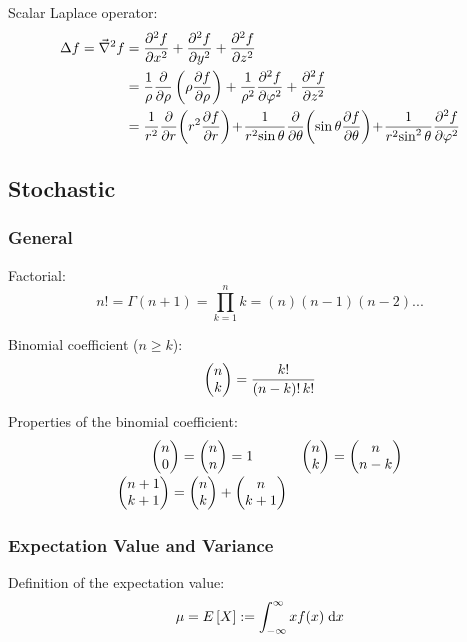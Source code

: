 			\noindent
			Scalar Laplace operator:
			\begin{equation}
				\begin{aligned}
					\Delta f = \Nabla^2 f &= \frac{\partial^2 f}{\partial x^2} + \frac{\partial^2 f}{\partial y^2} + \frac{\partial^2 f}{\partial z^2} \\
					&= \frac{1}{\rho} \frac{\partial}{\partial \rho}\left(\rho \frac{\partial f}{\partial \rho}\right)+ \frac{1}{\rho^2} \frac{\partial^2 f}{\partial \varphi^2}+ \frac{\partial^2 f}{\partial z^2} \\
					&= {\displaystyle \frac{1}{r^{2}} \frac{\partial }{\partial r}\!\left(r^{2}\frac{\partial f}{\partial r}\right)\!+\!\frac{1}{r^{2}\!\sin \theta } \frac{\partial }{\partial \theta }\!\left(\sin \theta \frac{\partial f}{\partial \theta }\right)\!+\!\frac{1}{r^{2}\!\sin ^{2}\theta }\frac{\partial ^{2}f}{\partial \varphi ^{2}}}
				\end{aligned}
			\end{equation}


	\subsection{Stochastic}
		\subsubsection{General}
			\noindent
			Factorial:
			\begin{equation}
				n!=\Gamma(n+1)=\prod_{k=1}^{n}k=(n)(n-1)(n-2)...
			\end{equation}

			\noindent
			Binomial coefficient ($n\ge k$):
			\begin{equation}
				\left(\begin{matrix}n\\k\end{matrix}\right) = \frac{k!}{\left(n-k\right)!\,k!}
			\end{equation}

			\noindent
			Properties of the binomial coefficient:
			\begin{equation}
				\begin{array}{cl}
					\left(\begin{matrix}n\\0\end{matrix}\right)=\left(\begin{matrix}n\\n\end{matrix}\right) = 1 & \left(\begin{matrix}n\\k\end{matrix}\right) = \left(\begin{matrix}n\\n-k\end{matrix}\right)\\ [8pt]
					\left(\begin{matrix}n+1\\k+1\end{matrix}\right)=\left(\begin{matrix}n\\k\end{matrix}\right)+\left(\begin{matrix}n\\k+1\end{matrix}\right)\\
				\end{array}
			\end{equation}

		\subsubsection{Expectation Value and Variance}
			\noindent
			Definition of the expectation value:
			\begin{equation}
				\mu = E\left[ X \right] := \int_{-\infty}^{\infty} xf(x)\;\mathrm{d} x
			\end{equation}

